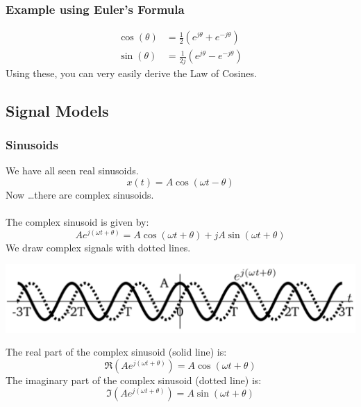 \documentclass[10pt]{article}
\begin{document}
\subsubsection*{Example using Euler's Formula}
\begin{align*}
    \cos(\theta) &= \frac{1}{2} \left(e^{j\theta} + e^{-j \theta}\right)\\
    \sin(\theta) &= \frac{1}{2j} \left(e^{j\theta} - e^{-j \theta}\right)
\end{align*}
Using these, you can very easily derive the Law of Cosines.

\subsection*{Signal Models}
\subsubsection*{Sinusoids}
We have all seen real sinusoids.
\[x(t) = A \cos(\omega t - \theta)\]
Now \dots there are complex sinusoids.\\\\
The complex sinusoid is given by:
\[Ae^{j(\omega t + \theta)} = A \cos(\omega t + \theta) + jA \sin(\omega t + \theta)\]
We draw complex signals with dotted lines.
\begin{center}
    \includegraphics[scale=0.6]{W1_6.png}
\end{center}
The real part of the complex sinusoid (solid line) is:
\[\mathfrak{R}\left(Ae^{j(\omega t + \theta)}\right) = A \cos(\omega t + \theta)\]
The imaginary part of the complex sinusoid (dotted line) is:
\[\mathfrak{I}\left(A e^{j(\omega t + \theta)}\right) = A \sin(\omega t + \theta)\]
\end{document}
